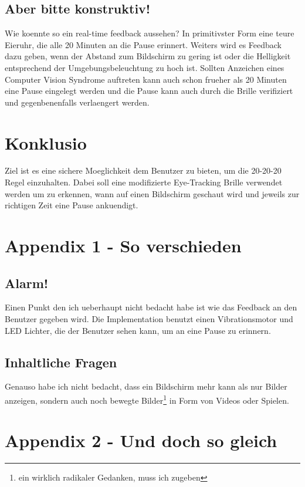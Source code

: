 \subsection{Aber bitte konstruktiv!}

Wie koennte so ein real-time feedback aussehen? In primitivster Form eine teure Eieruhr, die alle 20 Minuten an die Pause erinnert.
Weiters wird es Feedback dazu geben, wenn der Abstand zum Bildschirm zu gering ist oder die Helligkeit entsprechend der Umgebungsbeleuchtung
zu hoch ist. Sollten Anzeichen eines Computer Vision Syndrome auftreten kann auch schon frueher als 20 Minuten eine Pause eingelegt werden
und die Pause kann auch durch die Brille verifiziert und gegenbenenfalls verlaengert werden.

\section{Konklusio}

Ziel ist es eine sichere Moeglichkeit dem Benutzer zu bieten, um die 20-20-20 Regel einzuhalten. Dabei soll eine modifizierte Eye-Tracking Brille verwendet werden um zu erkennen, wann auf einen Bildschirm geschaut wird und jeweils zur richtigen Zeit eine Pause ankuendigt.

\section{Appendix 1 - So verschieden}

\subsection{Alarm!}

Einen Punkt den ich ueberhaupt nicht bedacht habe ist wie das Feedback an den Benutzer gegeben wird. Die Implementation benutzt 
einen Vibrationsmotor und LED Lichter, die der Benutzer sehen kann, um an eine Pause zu erinnern. 

\subsection{Inhaltliche Fragen}

Genauso habe ich nicht bedacht, dass ein Bildschirm mehr kann als nur Bilder anzeigen, sondern auch noch bewegte Bilder\footnote{ein wirklich radikaler Gedanken, muss ich zugeben} in Form von Videos oder Spielen.

\section{Appendix 2 - Und doch so gleich}

